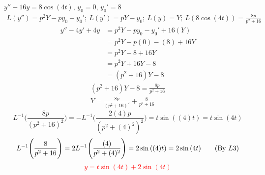 \item [9.] $y''+ 16y= 8 \cos{(4t)}$, $y_0=0$, $y_0'=8$
\begin{gather*}
    L(y'')=p^2Y-py_0-y_0';\:
    L(y')=pY-y_0;\:
    L(y)=Y;\:
    L(8 \cos{(4t)})=\frac{8p}{p^2+16}
\end{gather*}
\begin{align*}
    y''- 4y' + 4y
    &=p^2Y-py_0-y_0'+16(Y)\\
    &=p^2Y-p(0)-(8)+16Y\\
    &=p^2Y-8+16Y\\
    &=p^2Y+16Y-8\\
    &=(p^2+16)Y-8
\end{align*}
\begin{gather*}
    (p^2+16)Y-8=\frac{8p}{p^2+16}\\
    Y=\frac{8p}{(p^2+16)^2}+\frac{8}{p^2+16}
\end{gather*}
\begin{equation*}
    L^{-1}\Bigg(\frac{8p}{(p^2+16)^2}\Bigg) 
    = -L^{-1}\Bigg(\frac{2(4)p}{(p^2+(4)^2)^2}\Bigg) 
    =t \sin{((4)t)}
    =t \sin{(4t)}
    \tag{By \( L11 \)}
\end{equation*}
\begin{equation*}
    L^{-1}\Bigg(\frac{8}{p^2+16}\Bigg) 
    = 2L^{-1}\Bigg(\frac{(4)}{p^2+(4)^2}\Bigg) 
    =2\sin{((4)t)}
    =2\sin{(4t)}
    \tag{By \( L3 \)}\\
\end{equation*}
\textcolor{red}{\[
   y= t \sin{(4t)} + 2\sin{(4t)}
\]}
